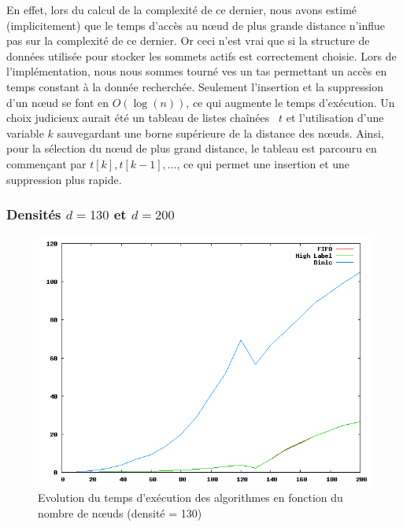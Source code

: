 En effet, lors du calcul de la complexité de ce dernier, nous avons estimé (implicitement) que le
temps d'accès au n\oe ud de plus grande distance n'influe pas sur la complexité de ce dernier. Or
ceci n'est vrai que si la structure de données utilisée pour stocker les sommets actifs est
correctement choisie. Lors de l'implémentation, nous nous sommes tourné ves un tas permettant un
accès en temps constant à la donnée recherchée. Seulement l'insertion et la suppression d'un n\oe ud
se font en $O(\log(n))$, ce qui augmente le temps d'exécution. Un choix judicieux aurait
été un tableau de listes chaînées~\cite{ahuj93} $t$ et l'utilisation d'une variable $k$ sauvegardant une borne
supérieure de la distance des n\oe uds. Ainsi, pour la sélection du n\oe ud de plus grand distance,
le tableau est parcouru en commençant par $t[k], t[k-1], \dots$, ce qui permet une insertion et une
suppression plus rapide.

\subsubsection{Densités $d=130$ et $d=200$}

\begin{figure}
\begin{center}
\includegraphics[scale=0.6]{../data_struct/results/ratio130.png}
\end{center}
\caption{Evolution du temps d'exécution des algorithmes en fonction du nombre de n\oe uds (densité =
130)}
\label{d130}
\end{figure}

